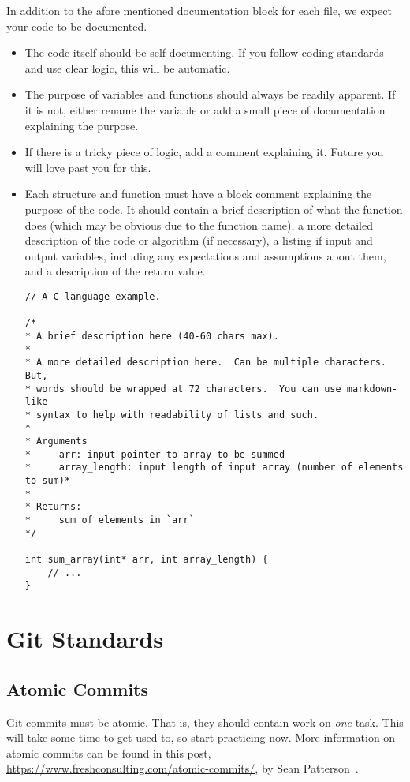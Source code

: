 In addition to the afore mentioned documentation block for each file, we expect your code to be documented.

\begin{itemize}
\setlength\itemsep{-1em}
    \item The code itself should be self documenting.  If you follow coding standards and use clear logic, this will be automatic.
    \item The purpose of variables and functions should always be readily apparent.  If it is not, either rename the variable or add a small piece of documentation explaining the purpose.
    \item If there is a tricky piece of logic, add a comment explaining it.  Future you will love past you for this.
    \item Each structure and function must have a block comment explaining the purpose of the code.  It should contain a brief description of what the function does (which may be obvious due to the function name), a more detailed description of the code or algorithm (if necessary), a listing if input and output variables, including any expectations and assumptions about them, and a description of the return value.
        \begin{verbatim}
// A C-language example.

/* 
* A brief description here (40-60 chars max).
* 
* A more detailed description here.  Can be multiple characters.  But,
* words should be wrapped at 72 characters.  You can use markdown-like
* syntax to help with readability of lists and such.
*
* Arguments
*     arr: input pointer to array to be summed
*     array_length: input length of input array (number of elements to sum)*  
*
* Returns:
*     sum of elements in `arr`
*/

int sum_array(int* arr, int array_length) {
    // ...
}
        \end{verbatim}
\end{itemize}

\pagebreak
\section{Git Standards}

\subsection{Atomic Commits}

Git commits must be atomic.  That is, they should contain work on \textit{one} task.  This will take some time to get used to, so start practicing now.  More information on atomic commits can be found in this post, \url{https://www.freshconsulting.com/atomic-commits/}, by Sean Patterson~\cite{Patterson2013}.

